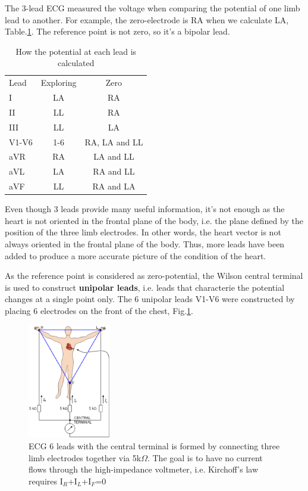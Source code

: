 The 3-lead ECG measured the voltage when comparing the potential of one limb
lead to another. For example, the zero-electrode is RA when we calculate LA,
Table.\ref{tab:ECG_leads}. The reference point is not zero, so it's a bipolar
lead.

\begin{table}[hbt]
\label{tab:ECG_leads}
\begin{center}
\begin{tabular}{lcc}
Lead & Exploring & Zero \\
I & LA & RA \\
II & LL & RA \\
III & LL & LA \\
V1-V6 & 1-6 & RA, LA and LL \\
aVR & RA & LA and LL \\
aVL & LA & RA and LL \\
aVF & LL & RA and LA \\
\end{tabular}
\end{center}
\caption{How the potential at each lead is calculated}
\end{table}

Even though 3 leads provide many useful information, it's not enough as the
heart is not oriented in the frontal plane of the body, i.e. the plane defined
by the position of the three limb electrodes. In other words, the heart vector
is not always oriented in the frontal plane of the body. Thus, more leads have
been added to produce a more accurate picture of the condition of the heart.

As the reference point is considered as zero-potential, the Wilson central
terminal is used to construct {\bf unipolar leads}, i.e.
leads that characterie the potential changes at a single point only. The 6
unipolar leads V1-V6 were constructed by placing 6 electrodes on the front of
the chest, Fig.\ref{fig:ECG_6leads}.

\begin{figure}[hbt]
  \centerline{\includegraphics[height=5cm,
    angle=0]{./images/ECG_6leads.eps}}
  \caption{ECG 6 leads with the central terminal is formed by connecting three
  limb electrodes together via 5k$\Omega$. The goal is to have no current flows
  through the high-impedance voltmeter, i.e. Kirchoff's law requires
  I$_R$+I$_L$+I$_F$=0}
  \label{fig:ECG_6leads}
\end{figure}

